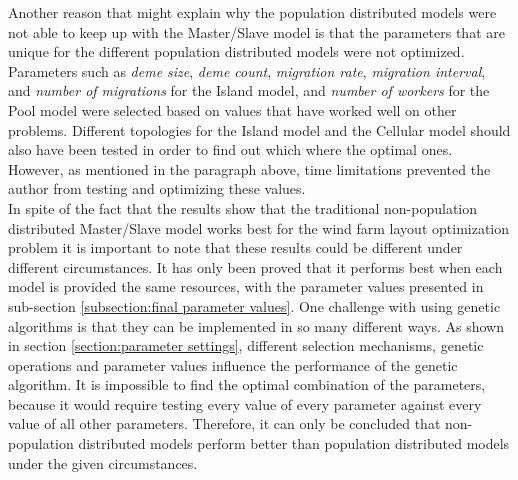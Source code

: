 \noindent Another reason that might explain why the population distributed models were not able to keep up with the Master/Slave model is that the parameters that are unique for the different population distributed models were not optimized. Parameters such as \textit{deme size}, \textit{deme count}, \textit{migration rate}, \textit{migration interval}, and \textit{number of migrations} for the Island model, and \textit{number of workers} for the Pool model were selected based on values that have worked well on other problems. Different topologies for the Island model and the Cellular model should also have been tested in order to find out which where the optimal ones. However, as mentioned in the paragraph above, time limitations prevented the author from testing and optimizing these values. \\

\noindent In spite of the fact that the results show that the traditional non-population distributed Master/Slave model works best for the wind farm layout optimization problem it is important to note that these results could be different under different circumstances. It has only been proved that it performs best when each model is provided the same resources, with the parameter values presented in sub-section \ref{subsection:final parameter values}. One challenge with using genetic algorithms is that they can be implemented in so many different ways. As shown in section \ref{section:parameter settings}, different selection mechanisms, genetic operations and parameter values influence the performance of the genetic algorithm. It is impossible to find the optimal combination of the parameters, because it would require testing every value of every parameter against every value of all other parameters. Therefore, it can only be concluded that non-population distributed models perform better than population distributed models under the given circumstances.\\

